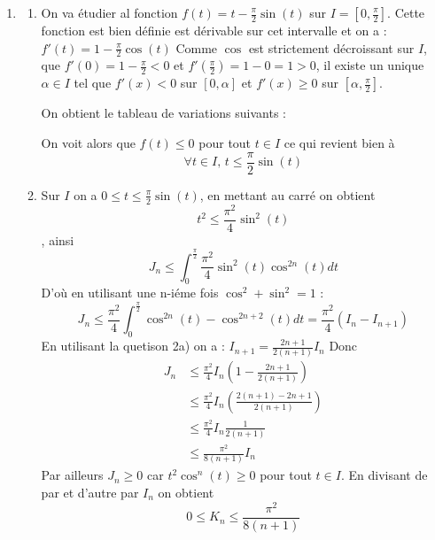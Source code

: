 \begin{correction}
\begin{enumerate}
\begin{enumerate}
\end{enumerate}

\item \begin{enumerate}
\item On  va étudier al fonction $f(t) = t- \frac{\pi}{2} \sin(t)$ sur $I=[0,\frac{\pi}{2}]$. Cette fonction est bien définie est dérivable sur cet intervalle et on  a : $f'(t)=1 -\frac{\pi}{2}\cos(t)$
Comme $\cos$ est strictement décroissant sur $I$, que $f'(0) =1-\frac{\pi}{2}<0$ et $f'(\frac{\pi}{2}) =1-0=1>0 $, il existe un unique $\alpha\in I$ tel que $f'(x)<0 $ sur $[0,\alpha]$ et $f'(x)\geq 0 $ sur $[\alpha,\frac{\pi}{2}]$. 

On obtient le tableau de variations suivants : 

\begin{center}
\end{center}
 
 On voit alors que $f(t)\leq 0$ pour tout $t\in I$ ce qui revient bien à 
 $$ \forall t \in  I, 
 \, t\leq \frac{\pi}{2 }\sin(t)$$
\item Sur $I$ on a $0\leq t \leq  \frac{\pi}{2 }\sin(t)$, en mettant au carré on obtient $$t^2 \leq  \frac{\pi^2}{4 }\sin^2(t)$$, ainsi 
$$J_n \leq \int_0^{\frac{\pi}{2}}   \frac{\pi^2}{4 }\sin^2(t) \cos^{2n}(t) dt$$
D'où en utilisant une n-iéme fois $\cos^2+\sin^2=1$ :
$$J_n \leq \frac{\pi^2}{4 }  \int_0^{\frac{\pi}{2}}   \cos^{2n}(t) - \cos^{2n+2}(t)   dt  = \frac{\pi^2}{4} (I_n-I_{n+1})$$
En utilisant la quetison 2a) on a :
$I_{n+1} = \frac{2n+1}{2(n+1)}I_n$ 
Donc 
\begin{align*}
J_n &\leq  \frac{\pi^2}{4} I_n \left( 1 - \frac{2n+1}{2(n+1)}\right)\\
			&\leq  \frac{\pi^2}{4} I_n \left(   \frac{2(n+1)- 2n+1}{2(n+1)}\right)\\
			&\leq  \frac{\pi^2}{4} I_n  \frac{1}{2(n+1)}\\
			&\leq  \frac{\pi^2}{8(n+1)} I_n  
\end{align*}
Par ailleurs $J_n\geq 0$ car $t^2 \cos^n(t)\geq 0$  pour tout $t\in I$. 
En divisant de par et d'autre par $I_n$ on  obtient 
$$0\leq K_n \leq   \frac{\pi^2}{8(n+1)} $$


\end{enumerate}
\end{enumerate}
\end{correction}
